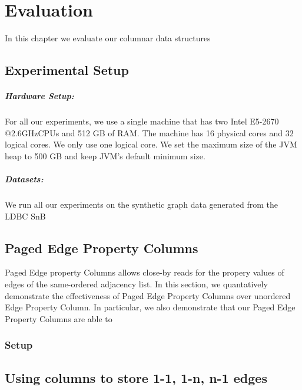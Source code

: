\chapter{Evaluation}
\label{c:evaluation}

In this chapter we evaluate our columnar data structures 


\section{Experimental Setup}

\paragraph{Hardware Setup:}For all our experiments, we use a single machine that has two Intel E5-2670 @2.6GHzCPUs and 512 GB of RAM. The machine has 16 physical cores and 32 logical cores. We only use one logical core. We set the maximum size of the JVM heap to 500 GB and keep JVM’s default minimum size.

\paragraph{Datasets:}We run all our experiments on the synthetic graph data generated from the LDBC SnB

\section{}

\section{Paged Edge Property Columns}

Paged Edge property Columns allows close-by reads for the propery values of edges of the same-ordered adjacency list. In this section, we quantatively demonstrate the effectiveness of Paged Edge Property Columns over unordered Edge Property Column. In particular, we also demonstrate that our Paged Edge Property Columns are able to 

\subsection{Setup}




\section{Using columns to store 1-1, 1-n, n-1 edges}
